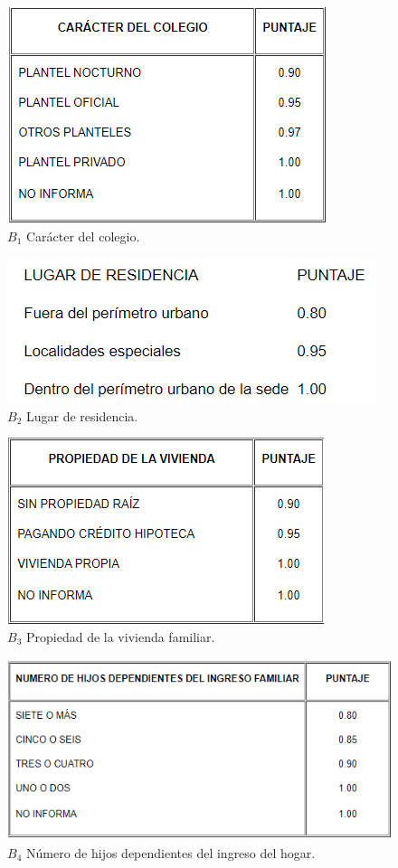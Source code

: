 \documentclass[
  11pt,
]{book}
\begin{document}
\begin{figure}
 
 {\centering \includegraphics[width=0.5\linewidth]{ProtectoR/b1} 
 
 }
 
 \caption{$B_1$ Carácter del colegio.}\label{fig:unnamed-chunk-22}
 \end{figure}
 \begin{figure}
 
 {\centering \includegraphics[width=0.5\linewidth]{ProtectoR/b2n} 
 
 }
 
 \caption{$B_2$ Lugar de residencia. }\label{fig:unnamed-chunk-23}
 \end{figure}
\begin{figure}

{\centering \includegraphics[width=0.5\linewidth]{ProtectoR/b3} 

}

\caption{$B_3$ Propiedad de la vivienda familiar.}\label{fig:unnamed-chunk-24}
\end{figure}

\begin{figure}

{\centering \includegraphics[width=0.5\linewidth]{ProtectoR/b4} 

}

\caption{$B_4$ Número de hijos dependientes del ingreso del hogar.}\label{fig:unnamed-chunk-25}
\end{figure}
\end{document}
